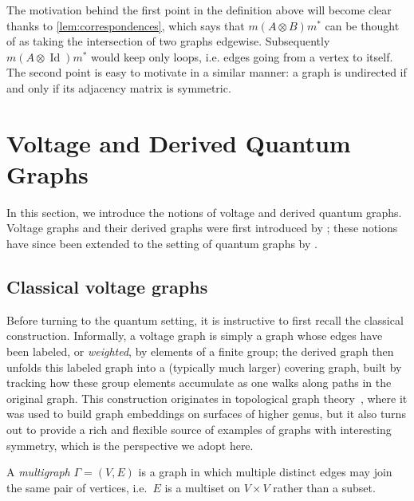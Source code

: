 \begin{remark}
    \label{rem:loop-free-motivation}
    The motivation behind the first point in the definition above
    will become clear thanks to \ref{lem:correspondences}, which says
    that \( m(A \otimes B)m^* \) can be thought of as taking the
    intersection of two graphs edgewise. Subsequently \( m(A \otimes
    \operatorname{Id})m^* \) would keep only loops, i.e. edges going
    from a vertex to itself. The second point is easy to motivate in
    a similar manner: a graph is undirected if and only if its
    adjacency matrix is symmetric.
\end{remark}

\section{Voltage and Derived Quantum Graphs}
\label{sec:voltage-and-derived-quantum-graphs}

In this section, we introduce the notions of voltage and derived
quantum graphs. Voltage graphs and their derived graphs were first
introduced by \textcite{gross74}; these notions have since
been extended to the setting of quantum graphs by \textcite{tobolski26}.

\subsection{Classical voltage graphs}
\label{subsec:classical-voltage-graphs}

Before turning to the quantum setting, it is instructive to first
recall the classical construction. Informally, a voltage graph is
simply a graph whose edges have been labeled, or \emph{weighted}, by
elements of a finite group; the derived graph then unfolds this
labeled graph into a (typically much larger) covering graph, built by
tracking how these group elements accumulate as one walks along paths
in the original graph. This construction originates in topological
graph theory~\cite{gross87}, where it was used to build graph
embeddings on surfaces of higher genus, but it also turns out to
provide a rich and flexible source of examples of graphs with
interesting symmetry, which is the
perspective we adopt here.

\begin{definition}
    \label{def:multigraph}
    A \emph{multigraph} \( \Gamma = (V,E) \) is a graph in which
    multiple distinct edges may join the same pair of vertices, i.e.\
    \( E \) is a multiset on \( V \times V \) rather than a subset.
\end{definition}

